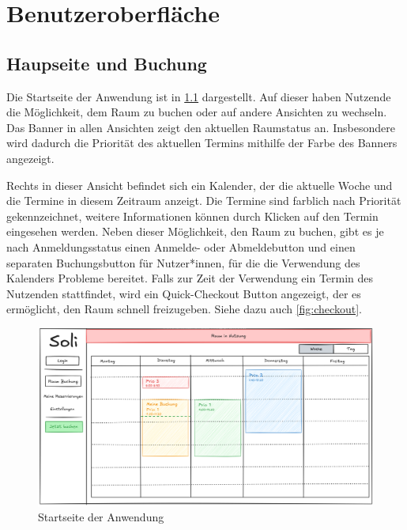 
\chapter{Benutzeroberfläche}
\label{chap:ui}

\section{Haupseite und Buchung}

Die Startseite der Anwendung ist in \ref{fig:startseite} dargestellt.
Auf dieser haben Nutzende die Möglichkeit, dem Raum zu buchen oder auf andere Ansichten zu wechseln.
Das Banner in allen Ansichten zeigt den aktuellen Raumstatus an.
Insbesondere wird dadurch die Priorität des aktuellen Termins mithilfe der Farbe des Banners angezeigt.

Rechts in dieser Ansicht befindet sich ein Kalender, der die aktuelle Woche und die Termine in diesem Zeitraum anzeigt.
Die Termine sind farblich nach Priorität gekennzeichnet, weitere Informationen können durch Klicken auf den Termin eingesehen werden.
Neben dieser Möglichkeit, den Raum zu buchen, gibt es je nach Anmeldungsstatus einen Anmelde- oder Abmeldebutton und einen separaten Buchungsbutton für Nutzer*innen,
für die die Verwendung des Kalenders Probleme bereitet.
Falls zur Zeit der Verwendung ein Termin des Nutzenden stattfindet, wird ein Quick-Checkout Button angezeigt,
der es ermöglicht, den Raum schnell freizugeben.
Siehe dazu auch \ref{fig:checkout}.

\begin{figure}[ht]
    \centering
    \includegraphics[width=\textwidth]{figures/ui/startseite}
    \caption{Startseite der Anwendung}
    \label{fig:startseite}
\end{figure}
\pagebreak


